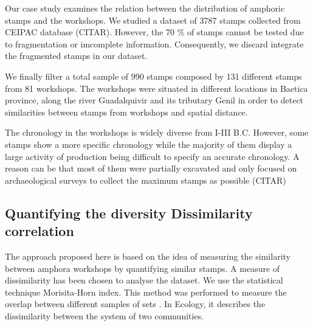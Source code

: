 \documentclass[review]{elsarticle}
\begin{document}
Our case study examines the relation between the distribution of amphoric stamps and the workshops. We studied a dataset of 3787 stamps collected from CEIPAC database (CITAR). However, the 70 \% of stamps cannot be tested due to fragmentation or imcomplete information. Consequently, we discard integrate the fragmented stamps in our dataset. 

We finally filter a total sample of 990 stamps composed by 131 different stamps from 81 workshops. The workshops were situated in different locations in Baetica province, along the river Guadalquivir and its tributary Genil in order to detect similarities between stamps from workshops and spatial distance. 

The chronology in the workshops is widely diverse from I-III B.C. However, some stamps show a more specific chronology while the majority of them display a large activity of production being difficult to specify an accurate chronology. A reason can be that most of them were partially excavated and only focused on archaeological surveys to collect the maximum stamps as possible (CITAR) 



\subsection{Quantifying the diversity Dissimilarity correlation}


The approach proposed here is based on the idea of measuring the similarity between amphora workshops by quantifying similar stamps. A measure of dissimilarity has been chosen to analyse the dataset. We use the statistical technique Morisita-Horn index. This method was performed to measure the overlap between different samples of sets \citep{morisita_measuring_1959, horn_measurement_1966}. In Ecology, it describes the dissimilarity between the system of two communities. 
\end{document}
